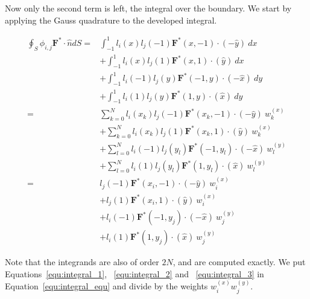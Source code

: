 Now only the second term is left, the integral over the boundary. We start by applying the Gauss
quadrature to the developed integral.

\begin{equation} \label{equ:integral_2}
	\begin{split}
        \oint_{S} \phi_{i, j}\mathbf{F}^* \cdot \widehat{n}dS = & 
        \int_{-1}^{1}l_i(x) l_j(-1)\mathbf{F}^*(x, -1) \cdot (-\widehat{y}) \: dx \\
        & + \int_{-1}^{1}l_i(x) l_j(1)\mathbf{F}^*(x, 1) \cdot (\widehat{y}) \: dx \\
        & + \int_{-1}^{1}l_i(-1) l_j(y)\mathbf{F}^*(-1, y) \cdot (-\widehat{x}) \: dy \\
        & + \int_{-1}^{1}l_i(1) l_j(y)\mathbf{F}^*(1, y) \cdot (\widehat{x}) \: dy \\
        = & \sum_{k = 0}^{N}l_i(x_k)l_j(-1)\mathbf{F}^*(x_k, -1)\cdot (-\widehat{y}) \: w_k^{(x)} \\
        & + \sum_{k = 0}^{N}l_i(x_k)l_j(1)\mathbf{F}^*(x_k, 1)\cdot (\widehat{y}) \: w_k^{(x)} \\
        & + \sum_{l = 0}^{N}l_i(-1)l_j(y_l)\mathbf{F}^*(-1, y_l)\cdot (-\widehat{x}) \: w_l^{(y)} \\
        & + \sum_{l = 0}^{N}l_i(1)l_j(y_l)\mathbf{F}^*(1, y_l)\cdot (\widehat{x}) \: w_l^{(y)} \\
        = & l_j(-1)\mathbf{F}^*(x_i, -1)\cdot (-\widehat{y}) \: w_i^{(x)} \\
        & + l_j(1)\mathbf{F}^*(x_i, 1)\cdot (\widehat{y}) \: w_i^{(x)} \\
        & + l_i(-1)\mathbf{F}^*(-1, y_j)\cdot (-\widehat{x}) \: w_j^{(y)} \\
        & + l_i(1)\mathbf{F}^*(1, y_j)\cdot (\widehat{x}) \: w_j^{(y)}
	\end{split}
\end{equation}

Note that the integrands are also of order $2 N$, and are computed exactly. We put
Equations~\ref{equ:integral_1}, ~\ref{equ:integral_2} and ~\ref{equ:integral_3} in
Equation~\ref{equ:integral_equ} and divide by the weights $w_i^{ \left( x \right) } w_j^{ \left( y \right) }$.

